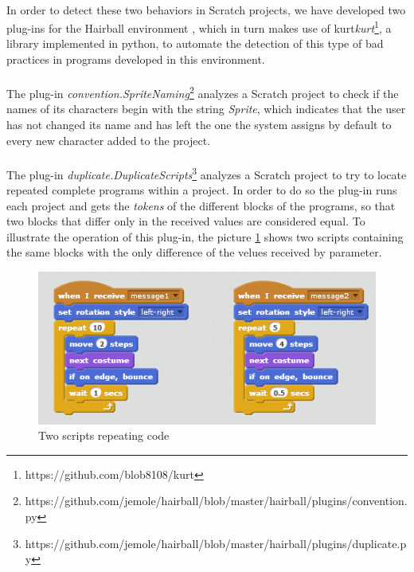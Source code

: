 \documentclass[a4paper,10pt]{article}
\begin{document}
\paragraph{}In order to detect these two behaviors in Scratch projects, we have developed two plug-ins for the Hairball environment \cite{boe2013hairball}, which in turn makes use of kurt\textit{kurt}\footnote{https://github.com/blob8108/kurt}, a library implemented in python, to automate the detection of this type of bad practices in programs developed in this environment.
\paragraph{}The plug-in \textit{convention.SpriteNaming}\footnote{https://github.com/jemole/hairball/blob/master/hairball/plugins/convention.py} analyzes a Scratch project to check if the names of its characters begin with the string \textit{Sprite}, which indicates that the user has not changed its name and has left the one the system assigns by default to every new character added to the project.
\paragraph{}The plug-in \textit{duplicate.DuplicateScripts}\footnote{https://github.com/jemole/hairball/blob/master/hairball/plugins/duplicate.py} analyzes a Scratch project to try to locate repeated complete programs within a project. In order to do so the plug-in runs each project and gets the \textit{tokens} of the different blocks of the programs, so that two blocks that differ only in the received values are considered equal. To illustrate the operation of this plug-in, the picture \ref{fig:CodeRepetition1} shows two scripts containing the same blocks with the only difference of the velues received by parameter.
\begin{figure}
  \centering
    \includegraphics{img/CodeRepetition1.png}
  \caption{Two scripts repeating code}
  \label{fig:CodeRepetition1}
\end{figure}
\end{document}
